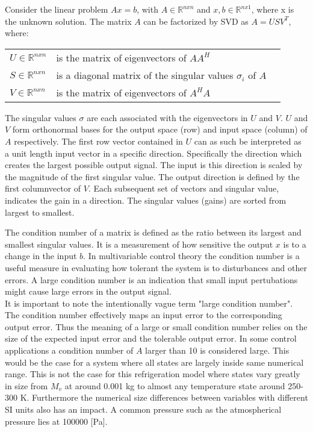 Consider the linear problem $Ax=b$, with $A \in \mathbb{R} ^{n x n}$ and $ x, b \in \mathbb{R} ^{n x 1}$, where x is the unknown solution. The matrix $A$ can be factorized by SVD as $A = USV^T$, where:
\smallskip
\begin{center}
	\begin{tabular}{l p{8cm} l}
		$U \in \mathbb{R} ^{n x n}$		& is the matrix of eigenvectors of $AA^H$  &  \\
		$S \in \mathbb{R} ^{n x n}$ 	& is a diagonal matrix of the singular values $\sigma_i$ of $A$ &  \\
		$V \in \mathbb{R} ^{n x n}$		& is the matrix of eigenvectors of $A^HA$  &  \\
	\end{tabular}
\end{center}
\smallskip
The singular values $\sigma$ are each associated with the eigenvectors in $U$ and $V$. $U$ and $V$ form orthonormal bases for the output space (row) and input space (column) of $A$ respectively. The first row vector contained in $U$ can as such be interpreted as a unit length input vector in a specific direction. Specifically the direction which creates the largest possible output signal. The input is this direction is scaled by the magnitude of the first singular value. The output direction is defined by the first columnvector of $V$. Each subsequent set of vectors and singular value, indicates the gain in a direction. The singular values (gains) are sorted from largest to smallest.

The condition number of a matrix is defined as the ratio between its largest and smallest singular values. It is a measurement of how sensitive the output $x$ is to a change in the input $b$. In multivariable control theory the condition number is a useful measure in evaluating how tolerant the system is to disturbances and other errors. A large condition number is an indication that small input pertubations might cause large errors in the output signal.\\

It is important to note the intentionally vague term "large condition number". The condition number effectively maps an input error to the corresponding output error. Thus the meaning of a large or small condition number relies on the size of the expected input error and the tolerable output error. In some control applications a condition number of $A$ larger than 10 is considered large. This would be the case for a system where all states are largely inside same numerical range. This is not the case for this refrigeration model where states vary greatly in size from $M_v$ at around 0.001 \si{kg} to almost any temperature state around 250-300 \si{K}. Furthermore the numerical size differences between variables with different SI units also has an impact. A common pressure such as the atmospherical pressure lies at 100000 [Pa].

